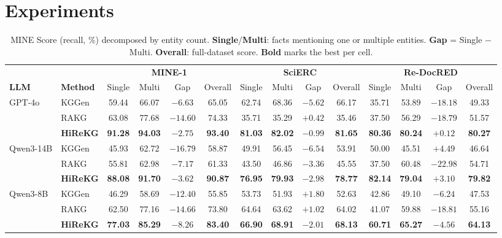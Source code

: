 \documentclass[11pt]{article}
\begin{document}
\section{Experiments}
\label{sec:experiments}


\begin{table}[t!]
\centering
\small
\setlength{\tabcolsep}{3pt}
\begin{tabular}{ll|cccc|cccc|cccc}
\toprule
& & \multicolumn{4}{c|}{\textbf{MINE-1}} & \multicolumn{4}{c|}{\textbf{SciERC}} & \multicolumn{4}{c}{\textbf{Re-DocRED}} \\
\textbf{LLM} & \textbf{Method} & Single & Multi & Gap & Overall & Single & Multi & Gap & Overall & Single & Multi & Gap & Overall \\
\midrule
\multirow{3}{*}{GPT-4o} 
& KGGen      & 59.44 & 66.07 & $-6.63$ & 65.05 & 62.74 & 68.36 & $-5.62$  & 66.17 & 35.71 & 53.89 & $-18.18$ & 49.33 \\
& RAKG       & 63.08 & 77.68 & $-14.60$ & 74.33 & 35.71 & 35.29 & $+0.42$  & 35.46 & 37.50 & 56.29 & $-18.79$ & 51.57 \\
& \textbf{HiReKG} & \textbf{91.28} & \textbf{94.03} & $-2.75$  & \textbf{93.40} & \textbf{81.03} & \textbf{82.02} & $-0.99$  & \textbf{81.65} & \textbf{80.36} & \textbf{80.24} & $+0.12$  & \textbf{80.27} \\
\midrule
\multirow{3}{*}{Qwen3-14B} 
& KGGen      & 45.93 & 62.72 & $-16.79$ & 58.87 & 49.91 & 56.45 & $-6.54$  & 53.91 & 50.00 & 45.51 & $+4.49$  & 46.64 \\
& RAKG       & 55.81 & 62.98 & $-7.17$  & 61.33 & 43.50 & 46.86 & $-3.36$  & 45.55 & 37.50 & 60.48 & $-22.98$ & 54.71 \\
& \textbf{HiReKG} & \textbf{88.08} & \textbf{91.70} & $-3.62$  & \textbf{90.87} & \textbf{76.95} & \textbf{79.93} & $-2.98$  & \textbf{78.77} & \textbf{82.14} & \textbf{79.04} & $+3.10$  & \textbf{79.82} \\
\midrule
\multirow{3}{*}{Qwen3-8B} 
& KGGen      & 46.29 & 58.69 & $-12.40$ & 55.85 & 53.73 & 51.93 & $+1.80$  & 52.63 & 42.86 & 49.10 & $-6.24$  & 47.53 \\
& RAKG       & 62.50 & 77.16 & $-14.66$ & 73.80 & 64.64 & 63.62 & $+1.02$  & 64.02 & 41.07 & 59.88 & $-18.81$ & 55.16 \\
& \textbf{HiReKG} & \textbf{77.03} & \textbf{85.29} & $-8.26$  & \textbf{83.40} & \textbf{66.90} & \textbf{68.91} & $-2.01$  & \textbf{68.13} & \textbf{60.71} & \textbf{65.27} & $-4.56$  & \textbf{64.13} \\
\bottomrule
\end{tabular}
\caption{MINE Score (recall, \%) decomposed by entity count. \textbf{Single}/\textbf{Multi}: facts mentioning one or multiple entities. \textbf{Gap} = Single $-$ Multi. \textbf{Overall}: full-dataset score. \textbf{Bold} marks the best per cell.}
\label{tab:recall}
\end{table}
\end{document}
